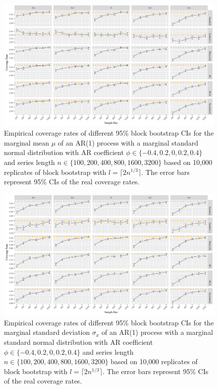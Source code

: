 \documentclass[12pt]{article}
\begin{document}
\begin{figure}[tbp]
  \centering
  \includegraphics[width=\textwidth]{figures/plot_norm_mu_2}
  \caption{Empirical coverage rates of different 95\% block bootstrap CIs for
    the marginal mean $\mu$ of an AR(1) process with a marginal standard 
    normal distribution with AR coefficient
    $\phi \in \{-0.4, 0.2, 0, 0.2, 0.4\}$ and series length
    $n \in \{100, 200, 400, 800, 1600, 3200\}$ based on 10,000 replicates of
    block bootstrap with $l = \lceil 2n^{1/3} \rceil$. The
    error bars represent 95\% CIs of the real coverage rates.}
  \label{fig:mu2}
\end{figure}


\begin{figure}[bp]
  \centering
  \includegraphics[width=\textwidth]{figures/plot_norm_sigma_2}
  \caption{Empirical coverage rates of different 95\% block bootstrap CIs for
    the marginal standard deviation $\sigma_x$ of an AR(1) process with a
    marginal standard normal distribution with AR 
    coefficient $\phi \in \{-0.4, 0.2, 0, 0.2, 0.4\}$ and series length 
    $n \in \{100, 200, 400, 800, 1600, 3200\}$ based on 10,000 replicates of
    block bootstrap with $l = \lceil 2n^{1/3} \rceil$. The 
    error bars represent 95\% CIs of the real coverage rates.}
  \label{fig:sigma2}
\end{figure}
\end{document}
